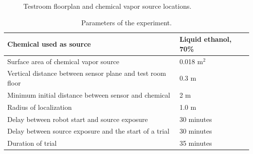 \documentclass[submit, 12pt]{aiaa-pretty-modified}
\newcommand{\tablewidthtwo}[0]{3in}
\begin{document}
\begin{figure}
\begin{center}
\caption{Testroom floorplan and chemical vapor source locations.}
\label{fig:testroom}
\end{center}
\end{figure}

\begin{table}
\caption{Parameters of the experiment.}
\begin{center}
\begin{tabular}{|p{\tablewidthtwo}|p{\tablewidthtwo}|}
\hline
Chemical used as source & Liquid ethanol, 70\% \\ \hline
Surface area of chemical vapor source & 0.018 $\text{m}^2$\\ \hline
Vertical distance between sensor plane and
test room floor & 0.3 $\text{m}$ \\ \hline
Minimum initial distance between sensor and chemical & 2 $\text{m}$ \\ \hline
Radius of localization & 1.0 $\text{m}$ \\ \hline
Delay between robot start and source exposure & 30 minutes \\ \hline
Delay between source exposure and the start of a trial & 30 minutes \\ \hline
Duration of trial & 35 minutes \\ \hline
\end{tabular}
\end{center}
\label{tab:parameters}
\end{table}
\end{document}
